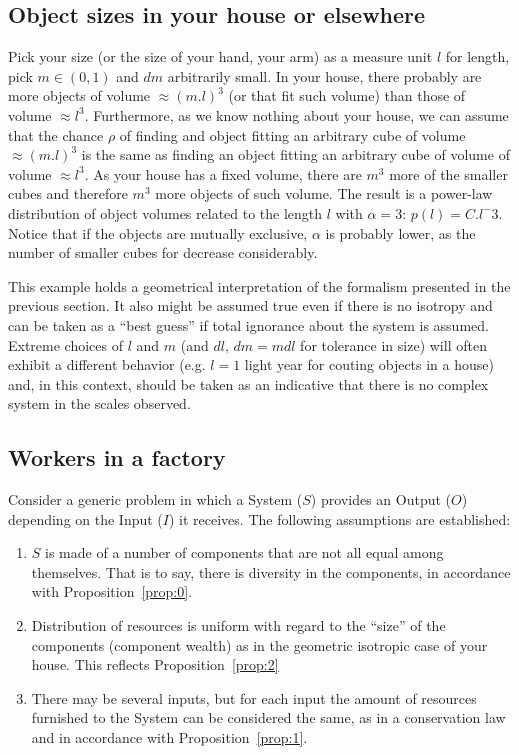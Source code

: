 \documentclass[a4paper, 11pt]{article} %
\begin{document}
\subsection{Object sizes in your house or elsewhere}
Pick your size (or the size of your hand, your arm)
as a measure unit $l$ for length, pick $m \in (0,1)$ 
and $dm$ arbitrarily small.
In your house, there probably are more objects
of volume $\approx (m.l)^3$ (or that fit such volume)
than those of volume $\approx l^3$.
Furthermore, as we know nothing about your house,
we can assume that the chance $\rho$ of finding and object
fitting an arbitrary cube of volume $\approx (m.l)^3$
is the same as finding an object fitting an
arbitrary cube of volume of volume $\approx l^3$.
As your house has a fixed volume, there are $m^3$ more of
the smaller cubes and therefore $m^3$ more objects of such
volume. 
The result is a power-law distribution of object volumes
related to the length $l$ with $\alpha=3$:
$p(l)=C.l^-3$.
Notice that if the objects are mutually exclusive,
$\alpha$ is probably lower, as the number of smaller
cubes for decrease considerably.

This example holds a geometrical
interpretation of the formalism presented in the previous section.
It also might be assumed true even if there is no isotropy
and can be taken as a ``best guess'' if total ignorance
about the system is assumed. 
Extreme choices of $l$ and $m$ (and $dl$, $dm=mdl$ for tolerance in size)
will often exhibit a different behavior (e.g. $l=1$ light year for couting objects in a house) and, in this context, should be taken as an indicative that there is no complex system in the scales observed. 

\subsection{Workers in a factory}
Consider a generic problem in which a System ($S$) provides an Output ($O$) depending on the Input ($I$) it receives.
The following assumptions are established:
\begin{enumerate}
	\item $S$ is made of a number of components that are not all equal among themselves.
That is to say, there is diversity in the components, in accordance with Proposition~\ref{prop:0}. 
\item Distribution of resources is uniform with regard to the ``size'' of the components (component wealth) as in the geometric isotropic case of your house.
This reflects Proposition~\ref{prop:2}
\item There may be several inputs, but for each input the amount of resources furnished to the System can be considered the same,
as in a conservation law and in accordance with Proposition~\ref{prop:1}.
\end{enumerate}
\end{document}
